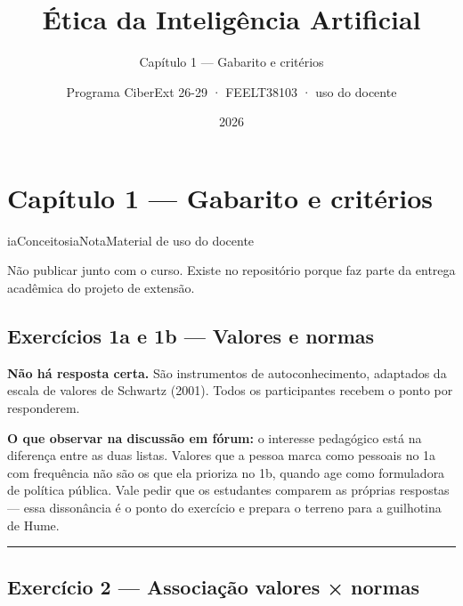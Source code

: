 \documentclass[
  11pt,
]{article}
\title{Ética da Inteligência Artificial}
\subtitle{Capítulo 1 --- Gabarito e critérios}
\author{Programa CiberExt 26-29 · FEELT38103 · uso do docente}
\date{2026}
\newenvironment{nota}[1][Nota]{\begin{iabox}{iaConceitos}{iaNota}{#1}}{\end{iabox}}
\begin{document}
\maketitle

{
\hypersetup{linkcolor=iaConceitos}
\setcounter{tocdepth}{2}
\tableofcontents
}
\hypertarget{capuxedtulo-1-gabarito-e-crituxe9rios}{%
\section{Capítulo 1 --- Gabarito e
critérios}\label{capuxedtulo-1-gabarito-e-crituxe9rios}}

\begin{nota}[Material de uso do docente]

Não publicar junto com o curso. Existe no repositório porque faz parte
da entrega acadêmica do projeto de extensão.

\end{nota}

\hypertarget{exercuxedcios-1a-e-1b-valores-e-normas}{%
\subsection{Exercícios 1a e 1b --- Valores e
normas}\label{exercuxedcios-1a-e-1b-valores-e-normas}}

\textbf{Não há resposta certa.} São instrumentos de autoconhecimento,
adaptados da escala de valores de Schwartz (2001). Todos os
participantes recebem o ponto por responderem.

\textbf{O que observar na discussão em fórum:} o interesse pedagógico
está na diferença entre as duas listas. Valores que a pessoa marca como
pessoais no 1a com frequência não são os que ela prioriza no 1b, quando
age como formuladora de política pública. Vale pedir que os estudantes
comparem as próprias respostas --- essa dissonância é o ponto do
exercício e prepara o terreno para a guilhotina de Hume.

\begin{center}\rule{0.5\linewidth}{0.5pt}\end{center}

\hypertarget{exercuxedcio-2-associauxe7uxe3o-valores-normas}{%
\subsection{Exercício 2 --- Associação valores ×
normas}\label{exercuxedcio-2-associauxe7uxe3o-valores-normas}}
\end{document}

